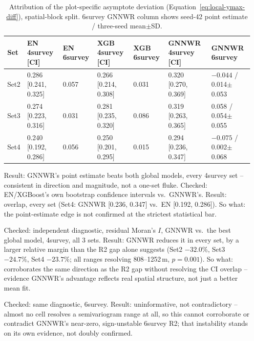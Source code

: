 \documentclass[logo,msc,ai]{infthesis}           %
\begin{document}
\begin{table}[!htbp]
\centering
\scriptsize
\renewcommand{\arraystretch}{1.2}
\begin{tabular}{lllllll}
\toprule
Set & EN 4survey [CI] & EN 6survey & XGB 4survey [CI] & XGB 6survey & GNNWR 4survey [CI] & GNNWR 6survey \\
\midrule
Set2 & 0.286 [0.241, 0.325] & 0.057 & 0.266 [0.214, 0.308] & 0.031 & 0.320 [0.270, 0.369] & $-0.044$ / 0.014$\pm$0.053 \\
Set3 & 0.274 [0.223, 0.316] & 0.031 & 0.281 [0.235, 0.320] & 0.086 & 0.319 [0.263, 0.365] & 0.058 / 0.054$\pm$0.055 \\
Set4 & 0.240 [0.192, 0.286] & 0.056 & 0.250 [0.201, 0.295] & 0.015 & 0.294 [0.236, 0.347] & $-0.075$ / 0.002$\pm$0.068 \\
\bottomrule
\end{tabular}
\caption{\small{Attribution of the plot-specific asymptote deviation
(Equation~\ref{eq:local-ymax-diff}), spatial-block split. 6survey GNNWR column shows
seed-42 point estimate / three-seed mean$\pm$SD.}}
\label{tab:results-rq3}
\end{table}

Result: GNNWR's point estimate beats both global models, every 4survey set --
consistent in direction and magnitude, not a one-set fluke.
Checked: EN/XGBoost's own bootstrap confidence intervals vs.\ GNNWR's. Result:
overlap, every set (Set4: GNNWR [0.236, 0.347] vs.\ EN [0.192, 0.286]).
So what: the point-estimate edge is not confirmed at the strictest statistical bar.

Checked: independent diagnostic, residual Moran's $I$, GNNWR vs.\ the best global
model, 4survey, all 3 sets. Result: GNNWR reduces it in every set, by a larger
relative margin than the R2 gap alone suggests (Set2 $-32.0\%$, Set3 $-24.7\%$,
Set4 $-23.7\%$; all ranges resolving 808--1252\,m, $p=0.001$).
So what: corroborates the same direction as the R2 gap without resolving the CI
overlap -- evidence GNNWR's advantage reflects real spatial structure, not just a
better mean fit.

Checked: same diagnostic, 6survey. Result: uninformative, not contradictory --
almost no cell resolves a semivariogram range at all, so this cannot corroborate
or contradict GNNWR's near-zero, sign-unstable 6survey R2; that instability
stands on its own evidence, not doubly confirmed.
\end{document}
